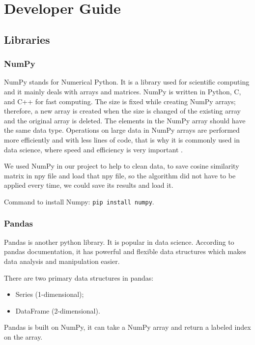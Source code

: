 \chapter{Developer Guide}
\label{ch:developer}

\section{Libraries}

\subsection{NumPy}

NumPy stands for Numerical Python. It is a library used for scientific computing and it mainly deals with arrays and matrices. NumPy is written in Python, C, and C++ for fast computing. The size is fixed while creating NumPy arrays; therefore, a new array is created when the size is changed of the existing array and the original array is deleted. The elements in the NumPy array should have the same data type. Operations on large data in NumPy arrays are performed more efficiently and with less lines of code, that is why it is commonly used in data science, where speed and efficiency is very important \cite{numpy}.

We used NumPy in our project to help to clean data, to save cosine similarity matrix in npy file and load that npy file, so the algorithm did not have to be applied every time, we could save its results and load it.

Command to install Numpy: \texttt{pip install numpy}.

\subsection{Pandas}

Pandas is another python library. It is popular in data science. According to pandas documentation, it has powerful and flexible data structures which makes data analysis and manipulation easier.

There are two primary data structures in pandas:

\begin{itemize}
\item Series (1-dimensional);
\item DataFrame (2-dimensional).
\end{itemize}

Pandas is built on NumPy,  it can take a NumPy array 
and return a labeled index on the array.

